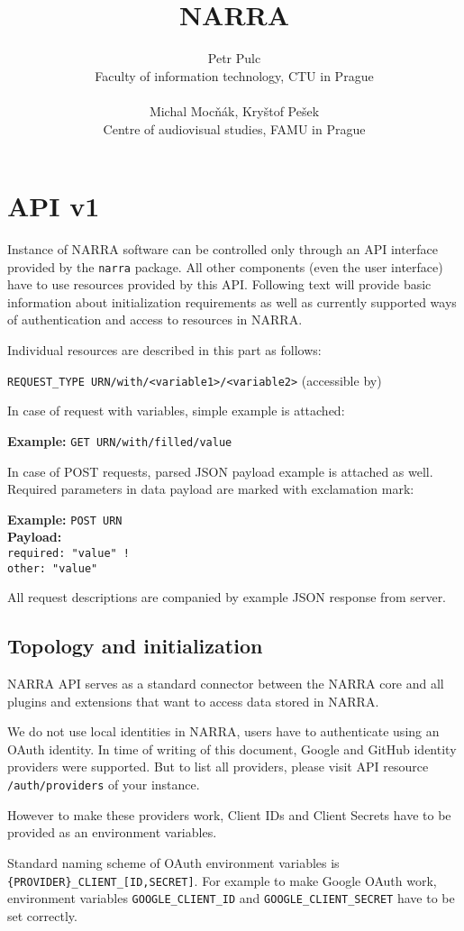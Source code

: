 \documentclass{book}
\title{NARRA}
\author{Petr Pulc\\
Faculty of information technology, CTU in Prague\\
~\\
Michal Mocňák, Kryštof Pešek\\
Centre of audiovisual studies, FAMU in Prague}
\newcommand{\request}[2]{{\color{blue}\texttt{#1} (#2)}}
\newcommand{\reqexample}[1]{{\color{blue}\textbf{Example:} \texttt{#1}}}
\newcommand{\reqpost}[2]{{\color{blue}\textbf{Example:} \texttt{#1}\\\textbf{Payload:}\\ \texttt{#2}}}
\newcommand{\required}{{\color{red}!}}
\begin{document}
\maketitle
\tableofcontents

\chapter{API v1}
Instance of NARRA software can be controlled only through an API interface provided by the \texttt{narra} package. All other components (even the user interface) have to use resources provided by this API. Following text will provide basic information about initialization requirements as well as currently supported ways of authentication and access to resources in NARRA.

Individual resources are described in this part as follows:

\request{REQUEST\_TYPE URN/with/<variable1>/<variable2>}{accessible by}

In case of request with variables, simple example is attached:

\reqexample{GET URN/with/filled/value}

In case of POST requests, parsed JSON payload example is attached as well. Required parameters in data payload are marked with exclamation mark:

\reqpost{POST URN}{required: "value" \required\\other: "value"}

All request descriptions are companied by example JSON response from server.

\section{Topology and initialization}
NARRA API serves as a standard connector between the NARRA core and all plugins and extensions that want to access data stored in NARRA.

We do not use local identities in NARRA, users have to authenticate using an OAuth identity. In time of writing of this document, Google and GitHub identity providers were supported. But to list all providers, please visit API resource \texttt{/auth/providers} of your instance.

However to make these providers work, Client IDs and Client Secrets have to be provided as an environment variables.

Standard naming scheme of OAuth environment variables is \texttt{\{PROVIDER\}\_CLIENT\_[ID,SECRET]}. For example to make Google OAuth work, environment variables \texttt{GOOGLE\_CLIENT\_ID} and \texttt{GOOGLE\_\allowbreak{}CLIENT\_SECRET} have to be set correctly.
\end{document}
